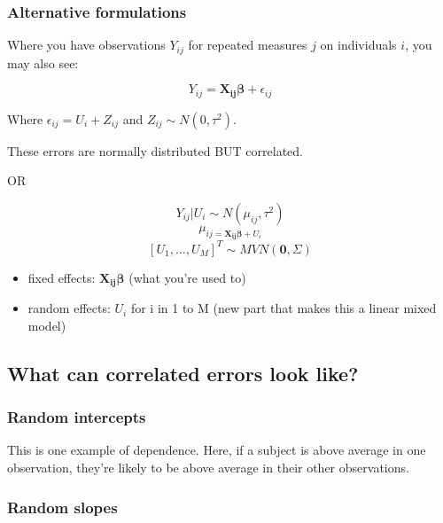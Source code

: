\documentclass[
  openany]{book}
\providecommand{\tightlist}{%
  \setlength{\itemsep}{0pt}\setlength{\parskip}{0pt}}
\begin{document}
\hypertarget{alternative-formulations}{%
\subsubsection{Alternative formulations}\label{alternative-formulations}}

Where you have observations \(Y_{ij}\) for repeated measures \(j\) on individuals \(i\), you may also see:

\[Y_{ij} = \boldsymbol{X_{ij}\beta} + \epsilon_{ij}\]

Where \(\epsilon_{ij} = U_i + Z_{ij}\) and \(Z_{ij} \sim N(0, \tau^2)\).

These errors are normally distributed BUT correlated.

OR

\[Y_{ij}|U_i \sim N(\mu_{ij}, \tau^2)\]
\[\mu_{ij{ = \boldsymbol{X_{ij}\beta}+U_i}}\]
\[ [U_1,\ldots,U_M]^T \sim MVN(\boldsymbol0, \Sigma)\]

\begin{itemize}
\tightlist
\item
  fixed effects: \(\boldsymbol{X_{ij}\beta}\) (what you're used to)
\item
  random effects: \(U_i\) for i in 1 to M (new part that makes this a linear mixed model)
\end{itemize}

\hypertarget{what-can-correlated-errors-look-like}{%
\subsection{What can correlated errors look like?}\label{what-can-correlated-errors-look-like}}

\hypertarget{random-intercepts}{%
\subsubsection{Random intercepts}\label{random-intercepts}}

This is one example of dependence. Here, if a subject is above average in one observation, they're likely to be above average in their other observations.

\hypertarget{random-slopes}{%
\subsubsection{Random slopes}\label{random-slopes}}
\end{document}
